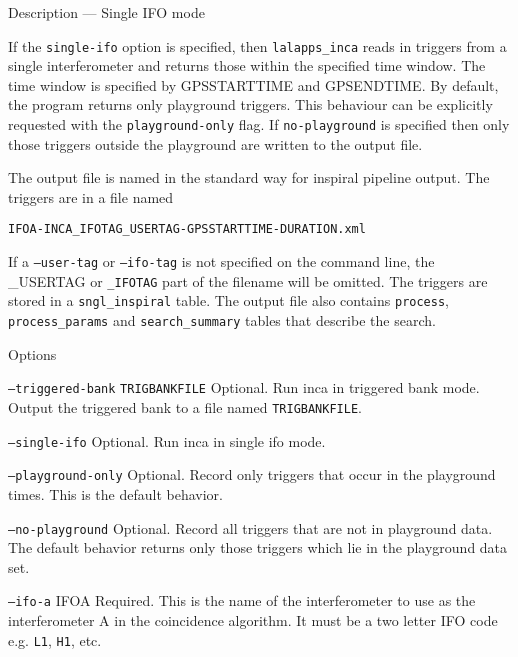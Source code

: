 \begin{entry}
\item[Description --- Single IFO mode]

If the \texttt{single-ifo} option is specified, then
\texttt{lalapps\_inca} reads in triggers from a single interferometer
and returns those within the specified time window.  The time window is
specified by \textsc{GPSSTARTTIME} and \textsc{GPSENDTIME}.
By default, the program returns only playground triggers.  This
behaviour can be explicitly requested with the \texttt{playground-only}
flag.  If \texttt{no-playground} is specified then only those triggers
outside the playground are written to the output file.

The output file is named in the standard way for inspiral pipeline output.
The triggers are in a file named\\
\begin{center}
\texttt{IFOA-INCA\_IFOTAG\_USERTAG-GPSSTARTTIME-DURATION.xml}\\
\end{center}

If a \texttt{--user-tag} or \texttt{--ifo-tag} is not specified on the
command line, the \textsc{\_USERTAG} or \texttt{\_IFOTAG} part of the
filename will be omitted.  The triggers are stored in a
\texttt{sngl\_inspiral} table.  The output file also contains
\texttt{process}, \texttt{process\_params} and \texttt{search\_summary}
tables that describe the search.

\item[Options]\leavevmode
\begin{entry}

\item[\texttt{--triggered-bank} \texttt{TRIGBANKFILE}] Optional.  Run
inca in triggered bank mode.  Output the triggered bank to a file named
\texttt{TRIGBANKFILE}.

\item[\texttt{--single-ifo}] Optional.  Run inca in single ifo mode.

\item[\texttt{--playground-only}] Optional.  Record only triggers that
occur in the playground times.  This is the default behavior.

\item[\texttt{--no-playground}] Optional.  Record all triggers that are
not in playground data.  The default behavior returns only those triggers
which lie in the playground data set.  

\item[\texttt{--ifo-a} \textsc{IFOA}] Required. This is the name of the
interferometer to use as the interferometer A in the coincidence algorithm.
It must be a two letter IFO code e.g. \texttt{L1}, \texttt{H1}, etc.


\end{entry}
\end{entry}
